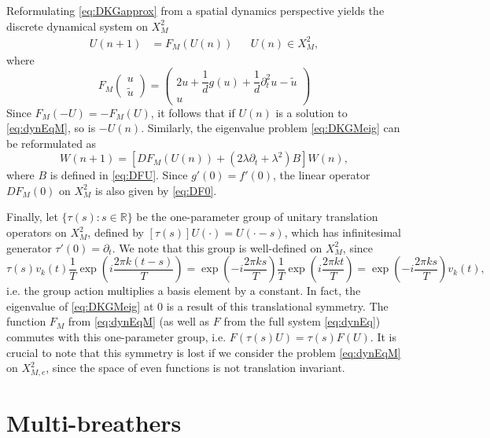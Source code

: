 \documentclass[12pt,reqno]{amsart}
\def\R{{\mathbb R}}
\theoremstyle{definition}
\begin{document}
Reformulating \cref{eq:DKGapprox} from a spatial dynamics perspective yields the discrete dynamical system on $X_M^2$
\begin{align}\label{eq:dynEqM}
U(n+1) &= F_M(U(n)) && U(n) \in X_M^2,
\end{align}
where
\begin{equation}\label{eq:FM}
F_M\begin{pmatrix}u \\ \tilde{u} \end{pmatrix} = 
\begin{pmatrix}2u  + \dfrac{1}{d}g(u) + \dfrac{1}{d} \partial_t^2 u - \tilde{u} \\
u
\end{pmatrix}
\end{equation}
Since $F_M(-U) = -F_M(U)$, it follows that if $U(n)$ is a solution to \cref{eq:dynEqM}, so is $-U(n)$. Similarly, the eigenvalue problem \cref{eq:DKGMeig} can be reformulated as
\begin{equation}\label{eq:dynEVPM}
W(n+1) = \left[ DF_M(U(n)) + (2 \lambda \partial_t + \lambda^2) B \right] W(n),
\end{equation}
where $B$ is defined in \cref{eq:DFU}. Since $g'(0) = f'(0)$, the linear operator $DF_M(0)$ on $X_M^2$ is also given by \cref{eq:DF0}. 

Finally, let $\{\tau(s) : s \in \R\}$ be the one-parameter group of unitary translation operators on $X_M^2$, defined by $[\tau(s)]U(\cdot) = U(\cdot - s)$, which has infinitesimal generator $\tau'(0) = \partial_t$. We note that this group is well-defined on $X_M^2$, since 
\[
\tau(s) v_k(t) 
\frac{1}{T} \exp\left( i \frac{2 \pi k (t-s)}{T}\right) 
= \exp\left( -i \frac{2 \pi k s}{T} \right) \frac{1}{T} \exp\left( i \frac{2 \pi k t}{T}\right) 
= \exp\left( -i \frac{2 \pi k s}{T} \right) v_k(t),
\]
i.e. the group action multiplies a basis element by a constant. In fact, the eigenvalue of \cref{eq:DKGMeig} at 0 is a result of this translational symmetry. The function $F_M$ from \cref{eq:dynEqM} (as well as $F$ from the full system \cref{eq:dynEq}) commutes with this one-parameter group, i.e. $F(\tau(s) U) = \tau(s) F(U)$. It is crucial to note that this symmetry is lost if we consider the problem \cref{eq:dynEqM} on $X_{M,e}^2$, since the space of even functions is not translation invariant. 

\section{Multi-breathers}\label{sec:multi}
\end{document}
